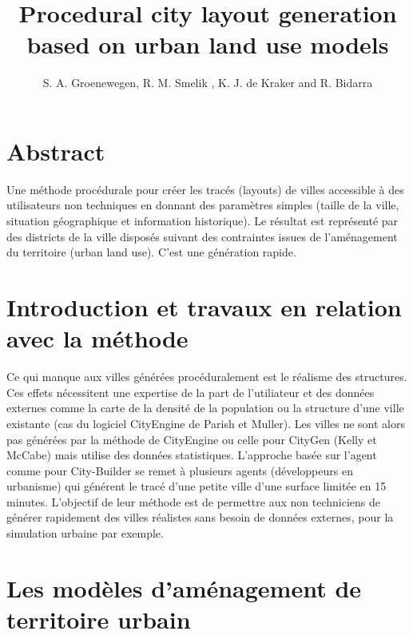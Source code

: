 \documentclass[11pt]{article}
\title{Procedural city layout generation based on urban land use models}
\author{S. A. Groenewegen, R. M. Smelik , K. J. de Kraker and R. Bidarra}
\date{
	\begin{center}
		EUROGRAPHICS 2009 / P. Alliez and M. Magnor\\
		TNODefence, Security and Safety, The Netherlands\\
		Delft University of Technology, The Netherlands\\
		Bauhaus-Universität Weimar, Germany
	\end{center}
}
\begin{document}
\maketitle

\section*{Abstract}

Une méthode procédurale pour créer les tracés (layouts) de villes accessible à des utilisateurs non techniques en donnant des paramètres simples (taille de la ville, situation géographique et information historique). Le résultat est représenté par des districts de la ville disposés suivant des contraintes issues de l'aménagement du territoire (urban land use). C'est une génération rapide.

\section{Introduction et travaux en relation avec la méthode}

Ce qui manque aux villes générées procéduralement est le réalisme des structures. Ces effets nécessitent une expertise de la part de l'utiliateur et des données externes comme la carte de la densité de la population ou la structure d'une ville existante (cas du logiciel CityEngine de Parish et Muller). Les villes ne sont alors pas générées par la méthode de CityEngine ou celle pour CityGen (Kelly et McCabe) mais utilise des données statistiques. L'approche basée sur l'agent comme pour City-Builder se remet à plusieurs agents (développeurs en urbanisme) qui générent le tracé d'une petite ville d'une surface limitée en 15 minutes. L'objectif de leur méthode est de permettre aux non techniciens de générer rapidement des villes réalistes sans besoin de données externes, pour la simulation urbaine par exemple.

\section{Les modèles d'aménagement de territoire urbain}
\end{document}

